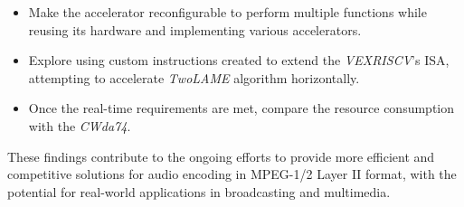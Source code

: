 \begin{itemize} 

\item Make the accelerator reconfigurable to perform multiple functions while reusing its hardware and implementing various accelerators.

\item Explore using custom instructions created to extend the  \textit{VEXRISCV}’s ISA, attempting to accelerate \textit{TwoLAME} algorithm horizontally. 

\item Once the real-time requirements are met, compare the resource consumption with the \textit{CWda74}.

\end{itemize} 

These findings contribute to the ongoing efforts to provide more efficient and competitive solutions for audio encoding in MPEG-1/2 Layer II format, with the potential for real-world applications in broadcasting and multimedia.




